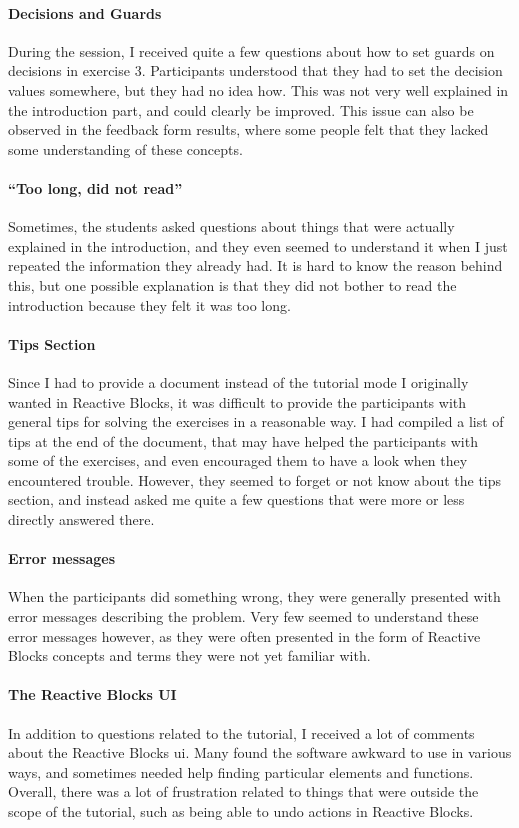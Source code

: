 \paragraph{Decisions and Guards} During the session, I received quite a few questions about how to set guards on decisions in exercise 3. Participants understood that they had to set the decision values somewhere, but they had no idea how. This was not very well explained in the introduction part, and could clearly be improved. This issue can also be observed in the feedback form results, where some people felt that they lacked some understanding of these concepts.

\paragraph{``Too long, did not read''} Sometimes, the students asked questions about things that were actually explained in the introduction, and they even seemed to understand it when I just repeated the information they already had. It is hard to know the reason behind this, but one possible explanation is that they did not bother to read the introduction because they felt it was too long.

\paragraph{Tips Section} Since I had to provide a document instead of the tutorial mode I originally wanted in Reactive Blocks, it was difficult to provide the participants with general tips for solving the exercises in a reasonable way. I had compiled a list of tips at the end of the document, that may have helped the participants with some of the exercises, and even encouraged them to have a look when they encountered trouble. However, they seemed to forget or not know about the tips section, and instead asked me quite a few questions that were more or less directly answered there.

\paragraph{Error messages} When the participants did something wrong, they were generally presented with error messages describing the problem. Very few seemed to understand these error messages however, as they were often presented in the form of Reactive Blocks concepts and terms they were not yet familiar with.

\paragraph{The Reactive Blocks UI} In addition to questions related to the tutorial, I received a lot of comments about the Reactive Blocks \gls{ui}. Many found the software awkward to use in various ways, and sometimes needed help finding particular elements and functions. Overall, there was a lot of frustration related to things that were outside the scope of the tutorial, such as being able to undo actions in Reactive Blocks.


